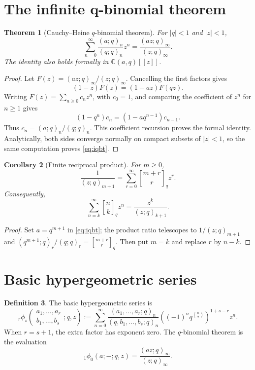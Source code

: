 \documentclass[11pt]{article}
\numberwithin{equation}{section}
\newtheorem{theorem}{Theorem}[section]
\newtheorem{corollary}[theorem]{Corollary}
\theoremstyle{definition}
\newtheorem{definition}[theorem]{Definition}
\newcommand{\qbinom}[2]{\genfrac{[}{]}{0pt}{}{#1}{#2}_{q}}
\newcommand{\C}{\mathbb C}
\begin{document}
\section{The infinite q-binomial theorem}
\begin{theorem}[Cauchy--Heine $q$-binomial theorem]
For $|q|<1$ and $|z|<1$,
\begin{equation}
\sum_{n=0}^{\infty}\frac{(a;q)_n}{(q;q)_n}z^n
=\frac{(az;q)_\infty}{(z;q)_\infty}.\label{eq:iqbt}
\end{equation}
The identity also holds formally in $\C(a,q)[[z]]$.
\end{theorem}
\begin{proof}
Let $F(z)=(az;q)_\infty/(z;q)_\infty$.  Cancelling the first factors gives
\[
(1-z)F(z)=(1-az)F(qz).
\]
Writing $F(z)=\sum_{n\ge0}c_nz^n$, with $c_0=1$, and comparing the coefficient of $z^n$ for $n\ge1$ gives
\[
(1-q^n)c_n=(1-aq^{n-1})c_{n-1}.
\]
Thus $c_n=(a;q)_n/(q;q)_n$.  This coefficient recursion proves the formal identity.  Analytically, both sides converge normally on compact subsets of $|z|<1$, so the same computation proves \eqref{eq:iqbt}.
\end{proof}

\begin{corollary}[Finite reciprocal product]
For $m\ge0$,
\[
\frac1{(z;q)_{m+1}}=\sum_{r=0}^{\infty}
\genfrac{[}{]}{0pt}{}{m+r}{r}_q z^r.
\]
Consequently,
\[
\sum_{n=k}^{\infty}\qbinom nk z^n=\frac{z^k}{(z;q)_{k+1}}.
\]
\end{corollary}
\begin{proof}
Set $a=q^{m+1}$ in \eqref{eq:iqbt}; the product ratio telescopes to $1/(z;q)_{m+1}$ and $(q^{m+1};q)_r/(q;q)_r=\genfrac{[}{]}{0pt}{}{m+r}{r}_q$.  Then put $m=k$ and replace $r$ by $n-k$.
\end{proof}

\section{Basic hypergeometric series}
\begin{definition}
The basic hypergeometric series is
\[
{}_r\phi_s\!\left(\begin{matrix}a_1,\ldots,a_r\\ b_1,\ldots,b_s\end{matrix};q,z\right)
:=\sum_{n=0}^{\infty}
\frac{(a_1,\ldots,a_r;q)_n}{(q,b_1,\ldots,b_s;q)_n}
\left((-1)^nq^{\binom n2}\right)^{1+s-r}z^n.
\]
When $r=s+1$, the extra factor has exponent zero.  The $q$-binomial theorem is the evaluation
\[
{}_1\phi_0(a;-;q,z)=\frac{(az;q)_\infty}{(z;q)_\infty}.
\]
\end{definition}
\end{document}
